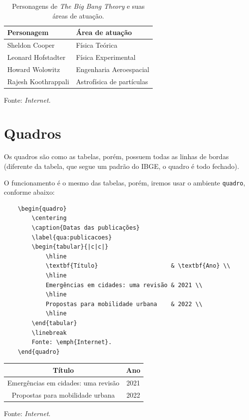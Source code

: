 \begin{table}[h]
    \centering
    \caption{Personagens de \emph{The Big Bang Theory} e suas áreas de atuação.}
    \label{tab:personagens}
    \begin{tabular}{ll}
        \hline
        \textbf{Personagem} & \textbf{Área de atuação}  \\ \hline
        Sheldon Cooper      & Física Teórica            \\
        Leonard Hofstadter  & Física Experimental       \\
        Howard Wolowitz     & Engenharia Aeroespacial   \\
        Rajesh Koothrappali & Astrofísica de partículas \\ \hline
    \end{tabular}
    \linebreak
    Fonte: \emph{Internet.}
\end{table}

\section{Quadros}
\label{sec:quadros}

Os quadros são como as tabelas, porém, possuem todas as linhas de bordas (diferente da tabela, que segue um padrão do IBGE, o quadro é todo fechado).

O funcionamento é o mesmo das tabelas, porém, iremos usar o ambiente \verb=quadro=, conforme abaixo:

\begin{verbatim}
    \begin{quadro}
        \centering
        \caption{Datas das publicações}
        \label{qua:publicacoes}
        \begin{tabular}{|c|c|}
            \hline
            \textbf{Título}                     & \textbf{Ano} \\
            \hline
            Emergências em cidades: uma revisão & 2021 \\
            \hline
            Propostas para mobilidade urbana    & 2022 \\
            \hline
        \end{tabular}
        \linebreak
        Fonte: \emph{Internet}.
    \end{quadro}
\end{verbatim}

\begin{quadro}
    \centering
    \caption{Datas das publicações}
    \label{qua:publicacoes}
    \begin{tabular}{|c|c|}
        \hline
        \textbf{Título}                     & \textbf{Ano} \\
        \hline
        Emergências em cidades: uma revisão & 2021 \\
        \hline
        Propostas para mobilidade urbana    & 2022 \\
        \hline
    \end{tabular}
    \linebreak
    Fonte: \emph{Internet}.
\end{quadro}

